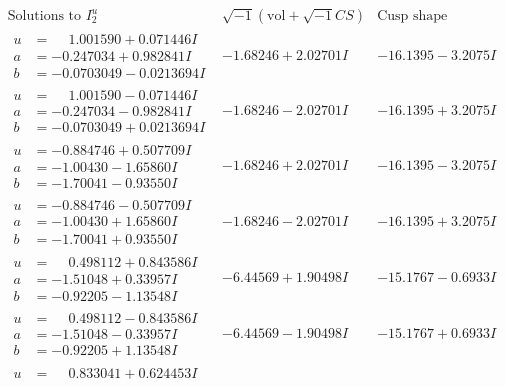 \documentclass[1p]{elsarticle_modified}
\theoremstyle{definition}
\newcommand{\I}{\sqrt{-1}}
\begin{document}
$$\begin{array}{c|c|c}  
\text{Solutions to }I^u_{2}& \I (\text{vol} + \sqrt{-1}CS) & \text{Cusp shape}\\
 \hline 
\begin{aligned}
u &= \phantom{-}1.001590 + 0.071446 I \\
a &= -0.247034 + 0.982841 I \\
b &= -0.0703049 - 0.0213694 I\end{aligned}
 & -1.68246 + 2.02701 I & -16.1395 - 3.2075 I \\ \hline\begin{aligned}
u &= \phantom{-}1.001590 - 0.071446 I \\
a &= -0.247034 - 0.982841 I \\
b &= -0.0703049 + 0.0213694 I\end{aligned}
 & -1.68246 - 2.02701 I & -16.1395 + 3.2075 I \\ \hline\begin{aligned}
u &= -0.884746 + 0.507709 I \\
a &= -1.00430 - 1.65860 I \\
b &= -1.70041 - 0.93550 I\end{aligned}
 & -1.68246 + 2.02701 I & -16.1395 - 3.2075 I \\ \hline\begin{aligned}
u &= -0.884746 - 0.507709 I \\
a &= -1.00430 + 1.65860 I \\
b &= -1.70041 + 0.93550 I\end{aligned}
 & -1.68246 - 2.02701 I & -16.1395 + 3.2075 I \\ \hline\begin{aligned}
u &= \phantom{-}0.498112 + 0.843586 I \\
a &= -1.51048 + 0.33957 I \\
b &= -0.92205 - 1.13548 I\end{aligned}
 & -6.44569 + 1.90498 I & -15.1767 - 0.6933 I \\ \hline\begin{aligned}
u &= \phantom{-}0.498112 - 0.843586 I \\
a &= -1.51048 - 0.33957 I \\
b &= -0.92205 + 1.13548 I\end{aligned}
 & -6.44569 - 1.90498 I & -15.1767 + 0.6933 I \\ \hline\begin{aligned}
u &= \phantom{-}0.833041 + 0.624453 I \\

\end{aligned}
\end{array}$$
\end{document}
